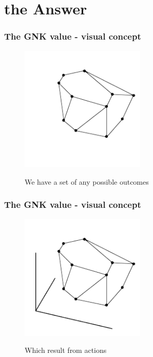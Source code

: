





\section{the Answer}




\begin{frame} \frametitle{The GNK value - visual concept} \begin{figure} \begin{center} \includegraphics[height=6cm]{figs/pp1} \end{center} We have a set of any possible outcomes \end{figure} \end{frame}
\begin{frame} \frametitle{The GNK value - visual concept} \begin{figure} \begin{center} \includegraphics[height=6cm]{figs/pp2} \end{center} Which result from actions \end{figure} \end{frame}
